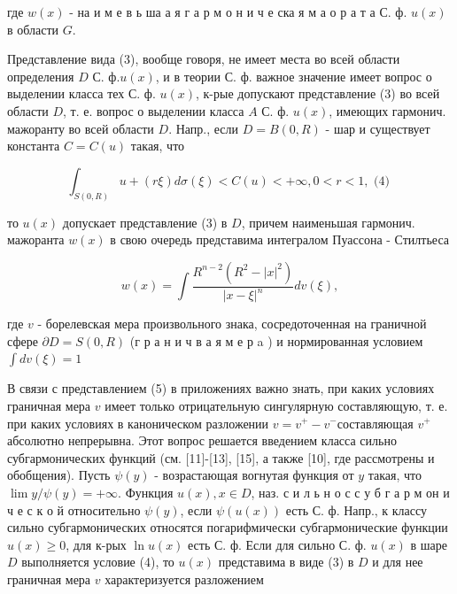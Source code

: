 \documentclass[10pt]{article}
\begin{document}
где $w(x)$ - на и м е в ь ша а я г а р м о н и ч е ска я м а о р а т а С. ф. $u(x)$ в области $G$.



Представление вида (3), вообще говоря, не имеет места во всей области определения $D$ С. $ф . u(x)$, и в теории С. ф. важное значение имеет вопрос о выделении класса тех С. ф. $u(x)$, к-рые допускают представление (3) во всей области $D$, т. е. вопрос о выделении класса $A$ С. ф. $u(x)$, имеющих гармонич. мажоранту во всей области $D$. Напр., если $D=B(0, R)$ - шар и существует константа $C=C(u)$ такая, что



\[

\int_{S(0, R)} u+(r \xi) d \sigma(\xi)<C(u)<+\infty, 0<r<1, \text { (4) }

\]



то $u(x)$ допускает представление (3) в $D$, причем наименьшая гармонич. мажоранта $w(x)$ в свою очередь представима интегралом Пуассона - Стилтьеса



\[

w(x)=\int \frac{R^{n-2}\left(R^{2}-|x|^{2}\right)}{|x-\xi|^{n}} d v(\xi),

\]



где $v$ - борелевская мера произвольного знака, сосредоточенная на граничной сфере $\partial D=S(0, R)$ (г р а н и ч в а я м е р a ) и нормированная условием $\int d v(\xi)=1$



В связи с представлением (5) в приложениях важно знать, при каких условиях граничная мера $v$ имеет только отрицательную сингулярную составляющую, т. е. при каких условиях в каноническом разложении $v=v^{+}-v^{-}$составляющая $v^{+}$абсолютно непрерывна. Этот вопрос решается введением класса сильно субгармонических функций (см. [11]-[13], [15], а также [10], где рассмотрены и обобщения). Пусть $\psi(y)$ - возрастающая вогнутая функция от $y$ такая, что $\lim y / \psi(y)=+\infty$. Функция $u(x), x \in D$, наз. с и л ь н о с с у б г а р м он и ч е с к о й относительно $\psi(y)$, если $\psi(u(x))$ есть С. ф. Напр., к классу сильно субгармонических относятся погарифмически субгармонические функции $u(x) \geqslant 0$, для к-рых $\ln u(x)$ есть С. ф. Если для сильно С. ф. $u(x)$ в шаре $D$ выполняется условие (4), то $u(x)$ представима в виде (3) в $D$ и для нее граничная мера $v$ характеризуется разложением
\end{document}
